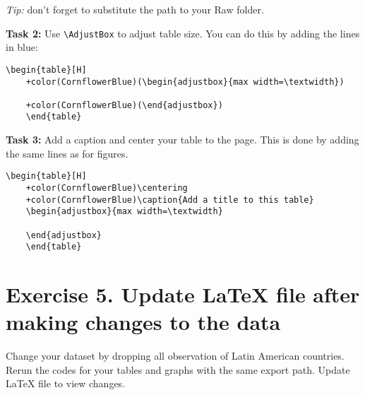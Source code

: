 \documentclass[12pts]{report}
\begin{document}
\begin{center}
	\textcolor{BurntOrange}{\emph{Tip:} don't forget to substitute the path to your Raw folder.}
\end{center}
		
\textbf{Task 2:} Use \verb|\AdjustBox| to adjust table size. You can do this by adding the lines in blue: 
	\begin{center}
	\begin{Verbatim}[commandchars=+\(\)]
	\begin{table}[H]
	+color(CornflowerBlue)(\begin{adjustbox}{max width=\textwidth})  
		
	+color(CornflowerBlue)(\end{adjustbox})
	\end{table}
	\end{Verbatim}
	\end{center}

\begin{center}
\end{center}

\textbf{Task 3:} Add a caption and center your table to the page. This is done by adding the same lines as for figures.

	\begin{center}
	\begin{Verbatim}[commandchars=+\(\)]
	\begin{table}[H]
	+color(CornflowerBlue)\centering
	+color(CornflowerBlue)\caption{Add a title to this table}
	\begin{adjustbox}{max width=\textwidth}
		
	\end{adjustbox}
	\end{table}
	\end{Verbatim}
	\end{center}

\section*{Exercise 5. Update {\LaTeX} file after making changes to the data}
Change your dataset by dropping all observation of Latin American countries. Rerun the codes for your tables and graphs with the same export path. Update {\LaTeX} file to view changes.
\end{document}
